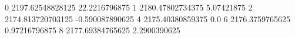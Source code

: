 0 2197.62548828125 22.2216796875
1 2180.47802734375 5.07421875
2 2174.813720703125 -0.590087890625
4 2175.40380859375 0.0
6 2176.3759765625 0.97216796875
8 2177.69384765625 2.2900390625
